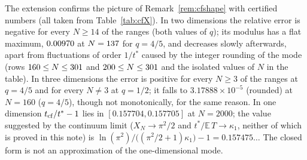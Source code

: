 \begin{table}[p]\centering\footnotesize

\caption{Certified bounds for the relative error of the closed form on sub-ranges of the extended ranges (conventions of Table~\ref{tab:cf}).}\label{tab:cfX}
\end{table}

\begin{remark}\label{rem:cfX}
The extension confirms the picture of Remark~\ref{rem:cfshape} with certified numbers (all taken from Table~\ref{tab:cfX}). In two dimensions the relative error is negative for every $N\ge14$ of the ranges (both values of $q$); its modulus has a flat maximum, $0.00970$ at $N=137$ for $q=4/5$, and decreases slowly afterwards, apart from fluctuations of order $1/t^*$ caused by the integer rounding of the mode (rows $160\le N\le301$ and $200\le N\le301$ and the isolated values of $N$ in the table). In three dimensions the error is positive for every $N\ge3$ of the ranges at $q=4/5$ and for every $N\ne3$ at $q=1/2$; it falls to $3.17888\times10^{-5}$ (rounded) at $N=160$ ($q=4/5$), though not monotonically, for the same reason. In one dimension $t_{\rm cf}/t^*-1$ lies in $[0.157704,0.157705]$ at $N=2000$; the value suggested by the continuum limit ($X_N\to\pi^2/2$ and $t^*/\mathbb E\,T\to\kappa_1$, neither of which is proved in this note) is $\ln(\pi^2)/\bigl((\pi^2/2+1)\kappa_1\bigr)-1=0.157475\ldots$ The closed form is not an approximation of the one-dimensional mode.
\end{remark}

